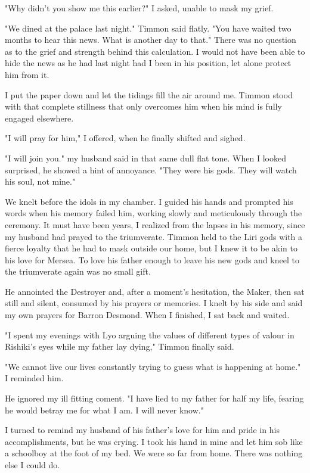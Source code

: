 \documentclass{article}
\begin{document}
"Why didn't you show me this earlier?" I asked, unable to mask my grief. 

"We dined at the palace last night." Timmon said flatly. "You have waited two months to hear this news. What is another day to that."  There was no question as to the grief and strength behind this calculation. I would not have been able to hide the news as he had last night had I been in his position, let alone protect him from it.

I put the paper down and let the tidings fill the air around me. Timmon stood with that complete stillness that only overcomes him when his mind is fully engaged elsewhere. 

"I will pray for him," I offered, when he finally shifted and sighed. 

"I will join you." my husband said in that same dull flat tone. When I looked surprised, he showed a hint of annoyance. "They were his gods. They will watch his soul, not mine."

We knelt before the idols in my chamber. I guided his hands and prompted his words when his memory failed him, working slowly and meticulously through the ceremony. It must have been years, I realized from the lapses in his memory, since my husband had prayed to the triumverate. Timmon held to the Liri gods with a fierce loyalty that he had to mask outside our home, but I knew it to be akin to his love for Mersea. To love his father enough to leave his new gods and kneel to the triumverate again was no small gift. 

He annointed the Destroyer and, after a moment's hesitation, the Maker, then sat still and silent, consumed by his prayers or memories. I knelt by his side and said my own prayers for Barron Desmond. When I finished, I sat back and waited.

"I spent my evenings with Lyo arguing the values of different types of valour in Rishiki's eyes while my father lay dying," Timmon finally said. 

"We cannot live our lives constantly trying to guess what is happening at home." I reminded him. 

He ignored my ill fitting coment. "I have lied to my father for half my life, fearing he would betray me for what I am. I will never know." 

I turned to remind my husband of his father's love for him and pride in his accomplishments, but he was crying. I took his hand in mine and let him sob like a schoolboy at the foot of my bed. We were so far from home. There was nothing else I could do.
\end{document}
